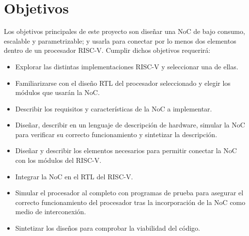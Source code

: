 \chapter{Objetivos}

Los objetivos principales de este proyecto son diseñar una NoC de bajo consumo, escalable y parametrizable; y usarla para conectar por lo menos dos elementos dentro de un procesador RISC-V. Cumplir dichos objetivos requerirá:

\begin{itemize}
    \item Explorar las distintas implementaciones RISC-V y seleccionar una de ellas.
    \item Familiarizarse con el diseño RTL del procesador seleccionado y elegir los módulos que usarán la NoC.
    \item Describir los requisitos y características de la NoC a implementar.
    \item Diseñar, describir en un lenguaje de descripción de hardware, simular la NoC para verificar su correcto funcionamiento y sintetizar la descripción.
    \item Diseñar y describir los elementos necesarios para permitir conectar la NoC con los módulos del \mbox{RISC-V}.
    \item Integrar la NoC en el RTL del RISC-V.
    \item Simular el procesador al completo con programas de prueba para asegurar el correcto funcionamiento del procesador tras la incorporación de la NoC como medio de interconexión.
    \item Sintetizar los diseños para comprobar la viabilidad del código.
\end{itemize}

